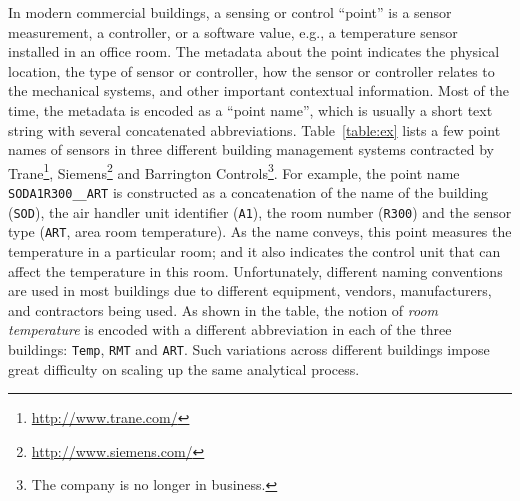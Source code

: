 In modern commercial buildings, a sensing or control ``point'' is a sensor
measurement, a controller, or a software value, e.g., a temperature sensor
installed in an office room. The metadata about the point indicates the physical
location, the type of sensor or controller, how the sensor or controller relates
to the mechanical systems, and other important contextual information. Most of
the time, the metadata is encoded as a ``point name'', which is usually a short
text string with several concatenated abbreviations. Table~\ref{table:ex} lists 
a few point names of sensors in three different building management systems contracted 
by Trane\footnote{\url{http://www.trane.com/}}, Siemens\footnote{\url{http://www.siemens.com/}} 
and Barrington Controls\footnote{The company is no longer in business.}. 
For example, the point name \texttt{SODA1R300\_\_ART} is constructed as a
concatenation of the name of the building (\texttt{SOD}), the air handler unit
identifier (\texttt{A1}), the room number (\texttt{R300}) and the sensor type
(\texttt{ART}, area room temperature). As the name conveys, this point measures 
the temperature in a particular room; and it also indicates the control unit that 
can affect the temperature in this room. Unfortunately, different naming conventions 
are used in most buildings due to different equipment, vendors, manufacturers, 
and contractors being used. As shown in the table, the notion of {\em room temperature} is encoded with a different abbreviation in each of the three buildings: \texttt{Temp}, \texttt{RMT} and \texttt{ART}.
Such variations across different buildings impose great difficulty on scaling up the same analytical process.


